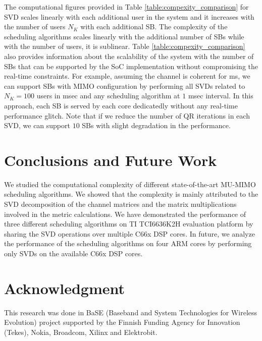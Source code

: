 \documentclass[conference,letterpaper]{./../../IEEE/IEEEtran}
\begin{document}
The computational figures provided in Table \ref{table:compexity_comparison} for SVD scales linearly with each additional user in the system and it increases with the number of users $N_K$ with each additional SB. The complexity of the scheduling algorithms scales linearly with the additional number of SBs while with the number of users, it is sublinear. Table \ref{table:compexity_comparison} also provides information about the scalability of the system with the number of SBs that can be supported by the \ac{SoC} implementation without compromising the real-time constraints. For example, assuming the channel is coherent for  ms, we can support  SBs with  MIMO configuration by performing all SVDs related to $N_K = 100$ users in  msec and any scheduling algorithm at $1$ msec interval. In this approach, each SB is served by each core dedicatedly without any real-time performance glitch. Note that if we reduce the number of QR iterations in each SVD, we can support $10$ SBs with slight degradation in the performance.

\acresetall {}
\section{Conclusions and Future Work}
\label{sec:conclusion}
We studied the computational complexity of different state-of-the-art MU-MIMO scheduling algorithms. We showed that the complexity is mainly attributed to the SVD decomposition of the channel matrices and the matrix multiplications involved in the metric calculations. We have demonstrated the performance of three different scheduling algorithms on TI TCI6636K2H evaluation platform by sharing the SVD operations over multiple C66x DSP cores. In future, we analyze the performance of the scheduling algorithms on four ARM cores by performing only SVDs on the available C66x DSP cores.

\section*{Acknowledgment}
This research was done in BaSE (Baseband and System Technologies for Wireless Evolution) project supported by the Finnish Funding Agency for Innovation (Tekes), Nokia, Broadcom, Xilinx and Elektrobit.



%
\end{document}
